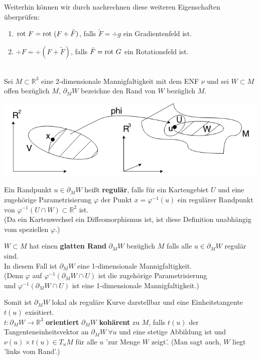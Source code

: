 Weiterhin können wir durch nachrechnen diese weiteren Eigenschaften überprüfen:
\begin{enumerate}
    \item
    $\mathrm{rot\ } F = \mathrm{rot\ } (F + \tilde{F}) $, falls $\tilde{F} = 
    \div g $  ein Gradientenfeld ist.
    \item
    $\div F = \div (F + \tilde{F}) $, falls $\tilde{F} = 
    \mathrm{rot\ } G $ ein Rotationsfeld ist.
\end{enumerate}

\begin{definition}
\mbox{}\\
Sei $M \subset \mathbb{R}^3 $ eine 2-dimensionale Mannigfaltigkeit mit dem ENF $\nu $
und sei $W \subset M $ offen bezüglich $M$, 
$\partial_M W $ bezeichne den Rand von $W$ bezüglich $M$.

\begin{center}
\includegraphics[scale=0.4]{pictures/009-01.png}
\end{center}

Ein Randpunkt $u \in \partial_M W $ heißt \textbf{regulär}, falls für ein Kartengebiet $U$
und eine zugehörige Parametrisierung $\varphi$ der Punkt $x = \varphi^{-1} (u) $
ein regulärer Randpunkt von $\varphi^{-1} (U \cap W) \subset \mathbb{R}^2 $ ist.\\
(Da ein Kartenwechsel ein Diffeomorphismus ist, ist diese Definition unabhängig vom
speziellen $\varphi$.)

$W \subset M $ hat einen \textbf{glatten Rand} $\partial_M W $ bezüglich $M$
falls alle  $u \in \partial_M W $ regulär sind.\\
In diesem Fall ist $\partial_M W $ eine 1-dimensionale Mannigfaltigkeit.\\
(Denn $\varphi$ auf $\varphi^{-1} (\partial_M W \cap U) $ 
ist die zugehörige Parametrisierung\\
und $\varphi^{-1} (\partial_M W \cap U) $ ist eine 1-dimensionale Mannigfaltigkeit.)

Somit ist $\partial_M W $ lokal als reguläre Kurve darstellbar und eine Einheitstangente
$t(u) $ exisitiert.\\
$t: \partial_M W \rightarrow \mathbb{R}^3 $ 
\textbf{orientiert} $\partial_M W $ \textbf{kohärent} zu $M$, 
falls $t(u) $ der Tangenteneinheitsvektor an $\partial_M W \ \forall u $ und
eine stetige Abbildung ist und 
$\nu(u) \times t(u) \in T_u M $ für alle $u$ 'zur Menge $W$ zeigt'.
(Man sagt auch, $W$ liegt 'links vom Rand'.)


\end{definition}
